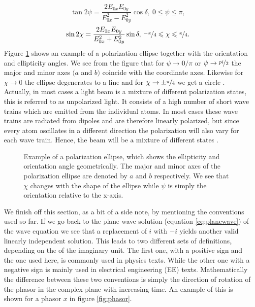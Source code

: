 \begin{equation}
    \label{eq:ellipse_orientation}
    \tan 2\psi = \frac{2E_{0x}E_{0y}}{E_{0x}^2 - E_{0y}^2}\cos \delta,\: 0\leqslant\psi\leqslant\pi,
\end{equation}
\begin{equation}
    \label{eq:ellipse_ellipticity}
    \sin 2\chi = \frac{2E_{0x}E_{0y}}{E_{0x}^2 + E_{0y}^2}\sin \delta,\: \nicefrac{-\pi}{4}\leqslant\chi\leqslant\nicefrac{\pi}{4}.
\end{equation}
Figure \ref{fig:pol_ellipse} shows an example of a polarization ellipse together with the orientation and ellipticity angles. We see from the figure that for $\psi \rightarrow 0/\pi$ or $\psi \rightarrow \nicefrac{pi}{2}$ the major and minor axes $(a$ and $b)$ coincide with the coordinate axes. Likewise for $\chi \rightarrow 0$ the ellipse degenerates to a line and for $\chi \rightarrow \pm\nicefrac{\pi}{4}$ we get a circle \cite{Collett2009FieldPolarization}. Actually, in most cases a light beam is a mixture of different polarization states, this is referred to as unpolarized light. It consists of a high number of short wave trains which are emitted from the individual atoms. In most cases these wave trains are radiated from dipoles and are therefore linearly polarized, but since every atom oscillates in a different direction the polarization will also vary for each wave train. Hence, the beam will be a mixture of different states \cite{Roth2019Optik}. 

\begin{figure}[h]
    \centering
    
    \caption{Example of a polarization ellipse, which shows the ellipticity and orientation angle geometrically. The major and minor axes of the polarization ellipse are denoted by $a$ and $b$ respectively. We see that $\chi$ changes with the shape of the ellipse while $\psi$ is simply the orientation relative to the x-axis.}
    \label{fig:pol_ellipse}
\end{figure}

We finish off this section, as a bit of a side note, by mentioning the conventions used so far. If we go back to the plane wave solution (equation \ref{eq:planewave}) of the wave equation we see that a replacement of $i$ with $-i$ yields another valid linearly independent solution. This leads to two different sets of definitions, depending on the of the imaginary unit. The first one, with a positive sign and the one used here, is commonly used in physics texts. While the other one with a negative sign is mainly used in electrical engineering (EE) texts. Mathematically the difference between these two conventions is simply the direction of rotation of the phasor in the complex plane with increasing time. An example of this is shown for a phasor $x$ in figure \ref{fig:phasor}. 

